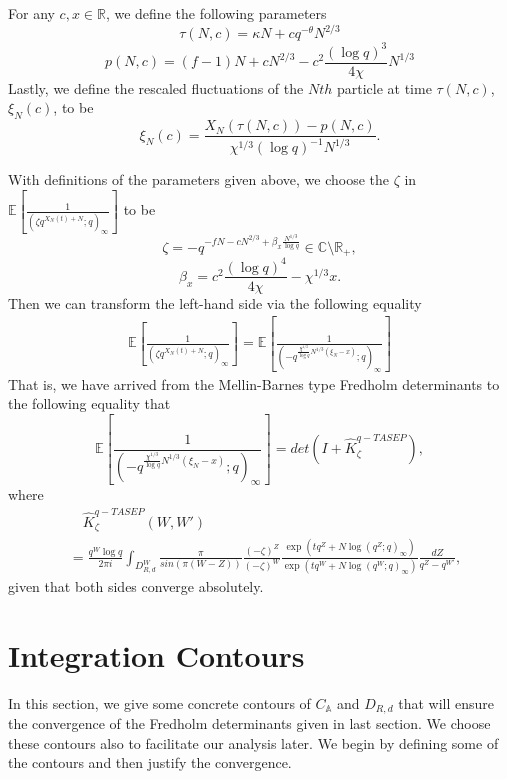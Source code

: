 \begin{definition}
For any $c,x \in \mathbb{R}$, we define the following parameters
\begin{equation*}
\tau(N,c) = \kappa N + cq^{-\theta}N^{2/3}
\end{equation*}
\begin{equation*}
p(N,c) = (f-1)N + cN^{2/3} - c^2 \frac{(\log q)^3}{4 \chi} N^{1/3}
\end{equation*}
Lastly, we define the rescaled fluctuations of the $Nth$ particle at time $\tau(N,c)$, $\xi_N(c)$, to be $$\xi_N(c) = \frac{X_N(\tau(N,c)) - p(N,c)}{\chi^{1/3} (\log q)^{-1} N^{1/3}}.$$
\end{definition}

With definitions of the parameters given above, we choose the $\zeta$ in $\mathbb{E} \left[ \frac{1}{(\zeta q^{X_N(t)+N}; q)_{\infty}} \right]$ to be 
\begin{equation}
\label{zeta-choice}
\zeta = -q^{-fN - cN^{2/3} + \beta_x \frac{N^{1/3}}{\log q}} \in \mathbb{C} \setminus \mathbb{R}_+,
\end{equation}
\begin{equation*}
\beta_x = c^2 \frac{(\log q)^4}{4 \chi} - \chi^{1/3} x.
\end{equation*}
Then we can transform the left-hand side via the following equality
\begin{align*}
\mathbb{E} \left[ \frac{1}{(\zeta q^{X_N(t)+N}; q)_{\infty}} \right] = \mathbb{E} \left[ \frac{1}{\left( -q^{ \frac{\chi^{1/3}}{\log q} N^{1/3} (\xi_N - x) }; q \right)_{\infty}} \right]
\end{align*}
That is, we have arrived from the Mellin-Barnes type Fredholm determinants to the following equality that 
\begin{equation}
\label{new-equality-mb-type}
\mathbb{E} \left[ \frac{1}{( -q^{ \frac{\chi^{1/3}}{\log q} N^{1/3} (\xi_N - x) }; q )_{\infty}} \right] = det(I+\hat{K}_{\zeta}^{q-TASEP}),
\end{equation}
where 
\begin{align*}
& \quad \hat{K}_{\zeta}^{q-TASEP}(W,W') \\
& = \frac{q^W \log q}{2 \pi i} \int_{D^W_{R,d}} \frac{\pi}{sin(\pi (W-Z))} \frac{(-\zeta)^Z}{(-\zeta)^W} \frac{\exp(tq^Z+N\log(q^Z;q)_{\infty})}{\exp(tq^W+N\log(q^W;q)_{\infty})} \frac{dZ}{q^Z - q^{W'}},
\end{align*}
given that both sides converge absolutely.

\section{Integration Contours}
In this section, we give some concrete contours of $C_{\mathbb{A}}$ and $D_{R,d}$ that will ensure the convergence of the Fredholm determinants given in last section. We choose these contours also to facilitate our analysis later. We begin by defining some of the contours and then justify the convergence. 

